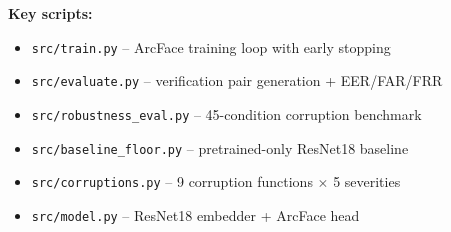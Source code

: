 \documentclass[conference]{IEEEtran}
\begin{document}
\noindent\textbf{Key scripts:}
\begin{itemize}
    \item \texttt{src/train.py} -- ArcFace training loop with early stopping
    \item \texttt{src/evaluate.py} -- verification pair generation + EER/FAR/FRR
    \item \texttt{src/robustness\_eval.py} -- 45-condition corruption benchmark
    \item \texttt{src/baseline\_floor.py} -- pretrained-only ResNet18 baseline
    \item \texttt{src/corruptions.py} -- 9 corruption functions $\times$ 5 severities
    \item \texttt{src/model.py} -- ResNet18 embedder + ArcFace head
\end{itemize}
\end{document}
